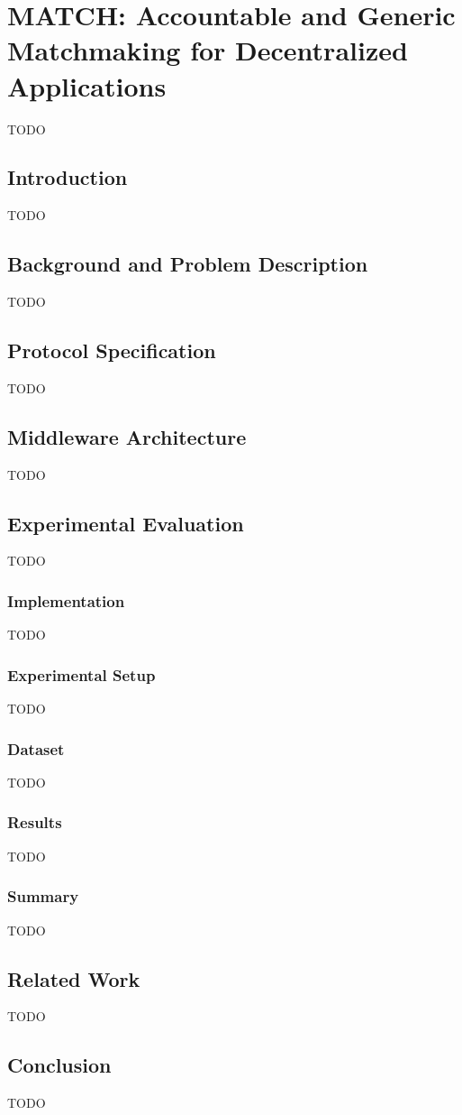 \chapter{MATCH: Accountable and Generic Matchmaking for Decentralized Applications}
\label{chapter5}

TODO

\section{Introduction}
TODO

\section{Background and Problem Description}
TODO

\section{Protocol Specification}
TODO

\section{Middleware Architecture}
TODO

\section{Experimental Evaluation}
TODO

\subsection{Implementation}
TODO

\subsection{Experimental Setup}
TODO

\subsection{Dataset}
TODO

\subsection{Results}
TODO

\subsection{Summary}
TODO

\section{Related Work}
TODO

\section{Conclusion}
TODO

\newpage



